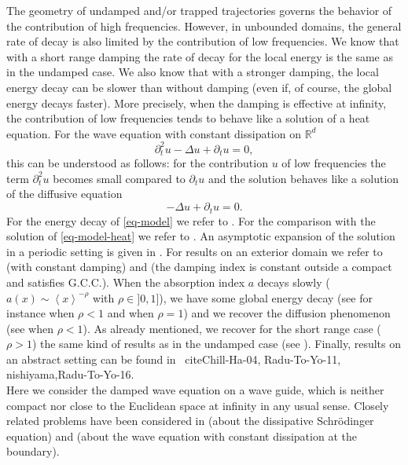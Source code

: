 \documentclass[10pt, a4paper,reqno]{amsart}
\theoremstyle{plain}
\theoremstyle{definition}
\theoremstyle{remark}
\begin{document}
The geometry of undamped and/or trapped trajectories governs the behavior of the contribution of high frequencies. However, in unbounded domains, the general rate of decay is also limited by the contribution of low frequencies. We know that with a short range damping the rate of decay for the local energy is the same as in the undamped case. We also know that with a stronger damping, the local energy decay can be slower than without damping (even if, of course, the global energy decays faster). More precisely, when the damping is effective at infinity, the contribution of low frequencies tends to behave like a solution of a heat equation. For the wave equation with constant dissipation on ${\mathbb{R}}^d$
\begin{equation} \label{eq-model}
\partial_t^2 u - {\Delta} u + \partial_t u = 0,
\end{equation}
this can be understood as follows: for the contribution $u$ of low frequencies the term $\partial_t^2 u$ becomes small compared to $\partial_t u$ and the solution behaves like a solution of the diffusive equation 
\begin{equation} \label{eq-model-heat}
- {\Delta} u + \partial_t u = 0.
\end{equation}
For the energy decay of \eqref{eq-model} we refer to \cite{Matsumura76}. For the comparison with the solution of \eqref{eq-model-heat} we refer to \cite{nishihara03,marcatin03, hosonoo04, narazaki04}. An asymptotic expansion of the solution in a periodic setting is given in \cite{OrivePaZu01}. For results on an exterior domain we refer to \cite{Ikehata02} (with constant damping) and \cite{AlouiIbKh15} (the damping index is constant outside a compact and satisfies G.C.C.). When the absorption index $a$ decays slowly ($a(x) \sim {\left< x \right>}^{-\rho}$ with $\rho \in ]0,1]$), we have some global energy decay (see for instance \cite{TodorovaYo09} when $\rho < 1$ and \cite{IkehataToYo13} when $\rho = 1$) and we recover the diffusion phenomenon (see \cite{Wakasugi14} when $\rho < 1$). As already mentioned, we recover for the short range case ($\rho > 1$) the same kind of results as in the undamped case (see \cite{Mochizuki76,boucletr14,royer-dld-energy-space}). Finally, results on an abstract setting can be found in \
cite{Chill-Ha-04, Radu-To-Yo-11, nishiyama,Radu-To-Yo-16}.\\

Here we consider the damped wave equation on a wave guide, which is neither compact nor close to the Euclidean space at infinity in any usual sense. Closely related problems have been considered in \cite{royer-diss-schrodinger-guide} (about the dissipative Schr\"odinger equation) and \cite{royer-diss-wave-guide} (about the wave equation with constant dissipation at the boundary).\\
\end{document}
